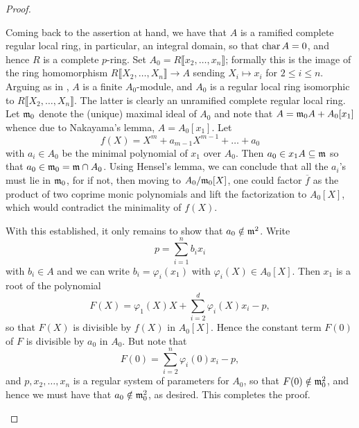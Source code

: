 \begin{proof}
\begin{enumerate}[label=(\arabic*)]
    Coming back to the assertion at hand, we have that $A$ is a ramified complete regular local ring, in particular, an integral domain, so that $\operatorname{char} A = 0$, and hence $R$ is a complete $p$-ring. 
    Set $A_0 = R\llbracket x_2,\dots,x_n\rrbracket$; formally this is the image of the ring homomorphism $R\llbracket X_2,\dots, X_n\rrbracket\to A$ sending $X_i\mapsto x_i$ for $2\le i\le n$. Arguing as in , $A$ is a finite $A_0$-module, and $A_0$ is a regular local ring isomorphic to $R\llbracket X_2,\dots, X_n\rrbracket$. The latter is clearly an unramified complete regular local ring. Let $\mathfrak{m}_0$ denote the (unique) maximal ideal of $A_0$ and note that $A = \mathfrak{m}_0 A + A_0[x_1]$ whence due to Nakayama's lemma, $A = A_0[x_1]$. Let 
    \begin{equation*}
        f(X) = X^m + a_{m - 1}X^{m - 1} + \dots + a_0
    \end{equation*}
    with $a_i\in A_0$ be the minimal polynomial of $x_1$ over $A_0$. Then $a_0\in x_1 A\subseteq\mathfrak{m}$ so that $a_0\in\mathfrak{m}_0 = \mathfrak{m}\cap A_0$. Using Hensel's lemma, we can conclude that all the $a_i$'s must lie in $\mathfrak{m}_0$, for if not, then moving to $A_0/\mathfrak{m}_0[X]$, one could factor $\overline f$ as the product of two coprime monic polynomials and lift the factorization to $A_0[X]$, which would contradict the minimality of $f(X)$. 
    
    With this established, it only remains to show that $a_0\notin\mathfrak{m}^2$. Write 
    \begin{equation*}
        p = \sum_{i = 1}^n b_ix_i
    \end{equation*}
    with $b_i\in A$ and we can write $b_i = \varphi_i(x_1)$ with $\varphi_i(X)\in A_0[X]$. Then $x_1$ is a root of the polynomial 
    \begin{equation*}
        F(X) = \varphi_1(X)X + \sum_{i = 2}^d \varphi_i(X)x_i - p,
    \end{equation*}
    so that $F(X)$ is divisible by $f(X)$ in $A_0[X]$. Hence the constant term $F(0)$ of $F$ is divisible by $a_0$ in $A_0$. But note that 
    \begin{equation*}
        F(0) = \sum_{i = 2}^n\varphi_i(0)x_i - p,
    \end{equation*}
    and $p, x_2,\dots, x_n$ is a regular system of parameters for $A_0$, so that $F(0)\notin\mathfrak{m}_0^2$, and hence we must have that $a_0\notin\mathfrak{m}_0^2$, as desired. This completes the proof. \qedhere
\end{enumerate}
\end{proof}